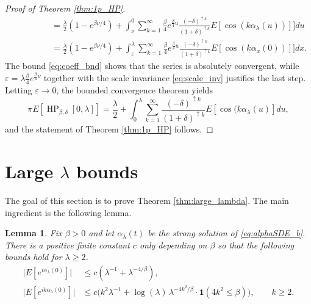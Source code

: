 \documentclass[12pt]{article}
\newtheorem{lemma}[theorem]{Lemma}
\theoremstyle{definition} %
\newcommand{\eps}{\varepsilon}
\theoremstyle{remark} %
\newcommand{\HPb}{\operatorname{HP}_{\beta, \delta}}
\newcommand{\ind}{\mathbf 1}
\begin{document}
\begin{proof}[Proof of Theorem \ref{thm:1p_HP}]
\begin{align*}
&\qquad\qquad =\frac{\lambda}{2}(1-e^{\beta \nu/4}) + \int_\nu^0 \sum_{k=1}^\infty  \frac{\beta}{4}e^{\frac{\beta}{4}u} \frac{(-\delta)^{\uparrow k}}{ (1+\delta)^{\uparrow k}}  E[\cos( k \alpha_\lambda(u))]] du\\
&\qquad\qquad =\frac{\lambda}{2}(1-e^{\beta \nu/4}) + \int_\eps^\lambda \sum_{k=1}^\infty  \frac{\beta}{4}e^{\frac{\beta}{4}u} \frac{(-\delta)^{\uparrow k}}{ (1+\delta)^{\uparrow k}}  E[\cos( k \alpha_x(0))]] dx.
\end{align*}
The  bound \eqref{eq:coeff_bnd} shows that the series is absolutely convergent, while $\eps=\lambda\frac{\beta}{4}e^{\frac{\beta}{4} \nu}$ together with the scale invariance \eqref{eq:scale_inv} justifies the last step.  Letting $\eps\to 0$,  the bounded convergence theorem yields \[
 \pi E[\HPb[0,\lambda]]=\frac{\lambda}{2}+\int_{0}^\lambda \sum_{k=1}^\infty    \frac{(-\delta)^{\uparrow k}}{ (1+\delta)^{\uparrow k}}  E[\cos(k \alpha_\lambda(u)] du,
\] and the statement of Theorem \ref{thm:1p_HP} follows.
\end{proof}



\section{Large $\lambda$ bounds}\label{sec:large_lambda}

The goal of this section is to prove Theorem \ref{thm:large_lambda}. The main ingredient is the following lemma. 
\begin{lemma}\label{lem:E_alpha}
Fix $\beta>0$ and let $\alpha_\lambda(t)$ be the strong solution of \eqref{eq:alphaSDE_b}. There is a positive finite constant $c$ only depending on $\beta$ so that the following bounds hold for $\lambda\ge 2$. 
\begin{align}\label{eq:eialpha_1}
   \big|E[e^{i \alpha_\lambda(0)}]\big|
   &\le c \left(\lambda^{-1} + \lambda^{-4/\beta}\right), \\[0.5em]
   \big|E[e^{i k \alpha_\lambda(0)}]\big|
   &\leq c  \Big(k^2 \lambda^{-1}+   \log(\lambda)\,\lambda^{-4k^2/\beta} \cdot \ind(4k^2\le \beta)\Big), \qquad k\ge 2.\label{eq:eialpha_k}
\end{align}
\end{lemma}
\end{document}
